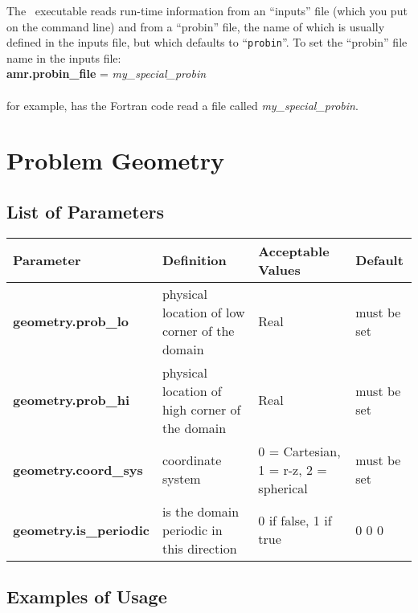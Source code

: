 The \nyx\ executable reads run-time information from an ``inputs'' file (which you put on the command line) 
and from a ``probin'' file, the name of which is usually defined in the
inputs file, but which defaults to ``{\tt probin}''.
To set the ``probin'' file name in the inputs file:\\

{\bf amr.probin\_file} = {\em my\_special\_probin} \\ \\
for example, has the Fortran code read a file called {\em my\_special\_probin}.

\section{Problem Geometry}

\subsection{List of Parameters}

\begin{table*}[h]
\begin{scriptsize}
\begin{tabular}{|l|l|l|l|} \hline
Parameter & Definition & Acceptable Values & Default \\
\hline
{\bf geometry.prob\_lo} & physical location of low corner of the domain & Real & must be set\\
{\bf geometry.prob\_hi} & physical location of high corner of the domain & Real  & must be set\\
{\bf geometry.coord\_sys} & coordinate system & 0 = Cartesian, 1 = r-z, 2 = spherical & must be set \\
{\bf geometry.is\_periodic} & is the domain periodic in this direction & 0 if false, 1 if true  & 0 0 0 \\
\hline
\end{tabular}
\label{Table:Geometry}
\end{scriptsize}
\end{table*}

\subsection{Examples of Usage}

